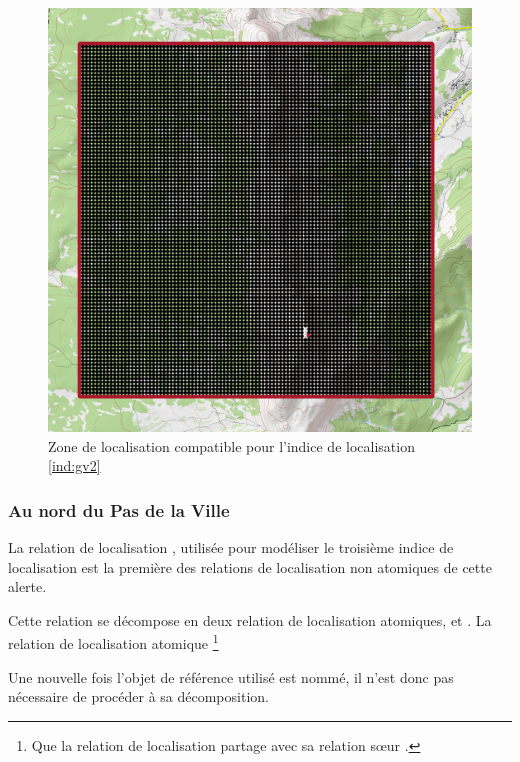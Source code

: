 \begin{figure}
  \centering
  \includegraphics{./figures/Sous_GrandVeymont.png}
  \caption{Zone de localisation compatible pour l'indice de
    localisation \ref{ind:gv2}}
  \label{fig:ZLC_GrandVeymont_2}
\end{figure}

\subsubsection{Au nord du Pas de la Ville}

La relation de localisation ,
utilisée pour modéliser le troisième indice de localisation est la
première des relations de localisation non atomiques de cette alerte.

% 
Cette relation se décompose en deux relation de localisation
atomiques,  et
. La relation de localisation
atomique  \footnote{Que la relation de
  localisation \protect{} partage avec
  sa relation sœur \protect{}.}

Une nouvelle fois l'objet de référence utilisé est nommé, il n'est
donc pas nécessaire de procéder à sa décomposition.

